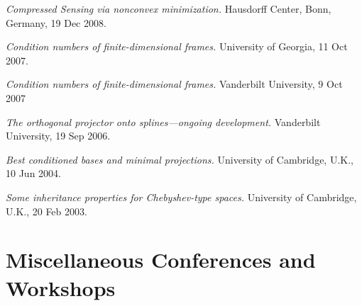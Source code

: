 \documentclass[11pt]{article}
\begin{document}
\item {\sl Compressed Sensing via nonconvex minimization.} Hausdorff Center, Bonn, Germany, 19 Dec 2008.
\item {\sl Condition numbers of finite-dimensional frames.}
University of Georgia, 11 Oct 2007.
\item {\sl Condition numbers of finite-dimensional frames.} Vanderbilt University,
9 Oct 2007
\item {\sl The orthogonal projector onto splines---ongoing development.}
Vanderbilt University, 19 Sep 2006.
\item  {\sl Best conditioned bases and minimal projections.}
University of Cambridge, U.K., 10 Jun 2004.
\item {\sl Some inheritance properties for Chebyshev-type spaces.}
University of Cambridge, U.K., 20 Feb 2003.
\eitemize



\section{Miscellaneous Conferences and Workshops}
\end{document}
